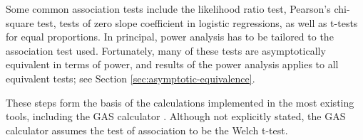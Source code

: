 
Some common association tests include the likelihood ratio test, Pearson's chi-square test, tests of zero slope coefficient in logistic regressions, as well as t-tests for equal proportions.
In principal, power analysis has to be tailored to the association test used.
Fortunately, many of these tests are asymptotically equivalent in terms of power, and results of the power analysis applies to all equivalent tests; see Section \ref{sec:asymptotic-equivalence}.

These steps form the basis of the calculations implemented in the most existing tools, including the GAS calculator \citep{Johnson17}.
Although not explicitly stated, the GAS calculator assumes the test of association to be the Welch t-test.

